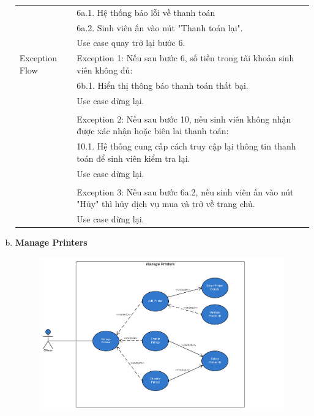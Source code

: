 \begin{enumerate}[a)]
\begin{longtable}{|l|p{10cm}|}
        & \hspace{1em} 6a.1. Hệ thống báo lỗi về thanh toán \\
        & \hspace{1em} 6a.2. Sinh viên ấn vào nút "Thanh toán lại".\\
        &\hspace{1em} Use case quay trở lại bước 6.
        \\
        \hline
        Exception Flow & Exception 1: Nếu sau bước 6, số tiền trong tài khoản sinh viên không đủ:\\
        & \hspace{1em} 6b.1. Hiển thị thông báo thanh toán thất bại.\\
        &\hspace{1em} Use case dừng lại.\\
        &\\
        & Exception 2: Nếu sau bước 10, nếu sinh viên không nhận được xác nhận hoặc biên lai thanh toán: \\
        & \hspace{1em} 10.1. Hệ thống cung cấp cách truy cập lại thông tin thanh toán để sinh viên kiểm tra lại.\\
        &\hspace{1em} Use case dừng lại.\\
        &\\
        & Exception 3: Nếu sau bước 6a.2, nếu sinh viên ấn vào nút "Hủy" thì hủy dịch vụ mua và trở về trang chủ.\\
        &\hspace{1em} Use case dừng lại.\\
    \end{longtable}
    
    \newpage
    \item{\textbf{Manage Printers}}
    \begin{center}
    \begin{figure}[htp]
    \begin{center}
     \includegraphics[scale=.62]{images/Task1/managePrinters.png}
    \end{center}
    \label{refhinh1}
    \end{figure}
    \end{center}


\end{enumerate}
